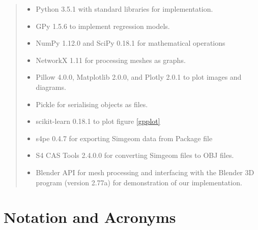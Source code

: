 \documentclass[ %
author={Dillon Keith Diep},
supervisor={Dr. Carl Henrik Ek},
degree={MEng},
title={ART-CG Hair:},
subtitle={Assisted Real-time Content Generation of Stylised Virtual Hair},
type={Research},
year={2017} ]{dissertation}
\begin{document}
	\begin{quote}
		\noindent
		\begin{itemize}
			\item Python 3.5.1 with standard libraries for implementation.
			\item GPy 1.5.6 to implement regression models.
			\item NumPy 1.12.0 and SciPy 0.18.1 for mathematical operations
			\item NetworkX 1.11 for processing meshes as graphs.
			\item Pillow 4.0.0, Matplotlib 2.0.0, and Plotly 2.0.1 to plot images and diagrams.
			\item Pickle for serialising objects as files.
			\item scikit-learn 0.18.1 to plot figure \ref{gpplot}
			\item s4pe 0.4.7 for exporting Simgeom data from Package file
			\item S4 CAS Tools 2.4.0.0 for converting Simgeom files to OBJ files.
			\item Blender API for mesh processing and interfacing with the Blender 3D program (version 2.77a) for demonstration of our implementation.
		\end{itemize}
	\end{quote}
	
	
	\chapter*{Notation and Acronyms}
	
\end{document}
